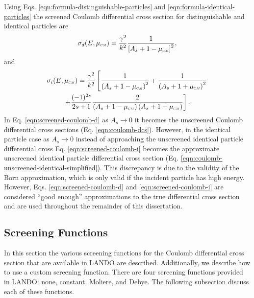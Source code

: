 Using Eqs. \eqref{eqn:formula-distinguishable-particles} and \eqref{eqn:formula-identical-particles} the screened Coulomb differential cross section for distinguishable and identical particles are
\begin{equation} \label{eqn:screened-coulomb-d}
    \sigma_{d}(E,\mucm) = \dfrac{\gamma^2}{k^2} \dfrac{1}{\left[A_s + 1 - \mucm\right]^2},
\end{equation}
and
\begin{multline} \label{eqn:screened-coulomb-i}
    \sigma_{i}(E,\mucm) = \dfrac{\gamma^2}{k^2} \left[ \dfrac{1}{\left(A_s + 1 - \mucm\right)^2} + \dfrac{1}{\left(A_s + 1 + \mucm\right)^2} \right. \\ \left. + \dfrac{(-1)^{2s}}{2s+1} \dfrac{2}{\left(A_s + 1 - \mucm\right)\left(A_s + 1 + \mucm\right) }\right].
\end{multline}
In Eq. \eqref{eqn:screened-coulomb-d} as $A_s \rightarrow 0$ it becomes the unscreened Coulomb differential cross sections (Eq. \eqref{eqn:coulomb-dcs}). However, in the identical particle case as $A_s \rightarrow 0$ instead of approaching the unscreened identical particle differential cross Eq. \eqref{eqn:screened-coulomb-i} becomes the approximate unscreened identical particle differential cross section (Eq. \eqref{eqn:coulomb-unscreened-identical-simplified}). This discrepancy is due to the validity of the Born approximation, which is only valid if the incident particle has high energy. However, Eqs. \eqref{eqn:screened-coulomb-d} and \eqref{eqn:screened-coulomb-i} are considered ``good enough'' approximations to the true differential cross section and are used throughout the remainder of this dissertation. 

\subsection{Screening Functions}
In this section the various screening functions for the Coulomb differential cross section that are available in LANDO are described. Additionally, we describe how to use a custom screening function. There are four screening functions provided in LANDO: none, constant, Moliere, and Debye. The following subsection discuss each of these functions.


